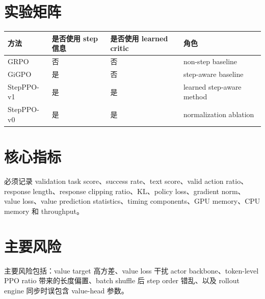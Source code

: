 \documentclass[10pt]{ctexart}
\begin{document}
\section*{实验矩阵}
\begin{center}
\begin{tabular}{llll}
\toprule
方法 & 是否使用 step 信息 & 是否使用 learned critic & 角色 \\
\midrule
GRPO & 否 & 否 & non-step baseline \\
GiGPO & 是 & 否 & step-aware baseline \\
StepPPO-v1 & 是 & 是 & learned step-aware method \\
StepPPO-v0 & 是 & 是 & normalization ablation \\
\bottomrule
\end{tabular}
\end{center}

\section*{核心指标}
必须记录 validation task score、success rate、text score、valid action ratio、response length、response clipping ratio、KL、policy loss、gradient norm、value loss、value prediction statistics、timing components、GPU memory、CPU memory 和 throughput。

\section*{主要风险}
主要风险包括：value target 高方差、value loss 干扰 actor backbone、token-level PPO ratio 带来的长度偏置、batch shuffle 后 step order 错乱、以及 rollout engine 同步时误包含 value-head 参数。
\end{document}
